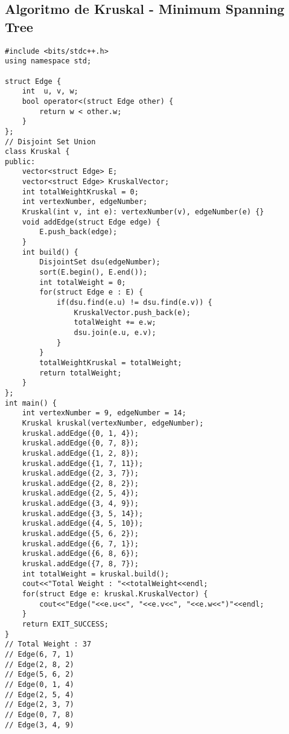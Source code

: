 \documentclass[10pt,letterpaper,twocolumn,twosided]{article}
\begin{document}
\subsection{Algoritmo de Kruskal - Minimum Spanning Tree}
\begin{lstlisting}
#include <bits/stdc++.h>
using namespace std;

struct Edge {
    int  u, v, w;
    bool operator<(struct Edge other) {
        return w < other.w;
    }
};
// Disjoint Set Union
class Kruskal {
public: 
    vector<struct Edge> E;
    vector<struct Edge> KruskalVector;
    int totalWeightKruskal = 0;
    int vertexNumber, edgeNumber;
    Kruskal(int v, int e): vertexNumber(v), edgeNumber(e) {}
    void addEdge(struct Edge edge) {
        E.push_back(edge);
    }
    int build() {
        DisjointSet dsu(edgeNumber);
        sort(E.begin(), E.end());
        int totalWeight = 0;
        for(struct Edge e : E) {
            if(dsu.find(e.u) != dsu.find(e.v)) {
                KruskalVector.push_back(e);
                totalWeight += e.w;
                dsu.join(e.u, e.v);
            }
        }
        totalWeightKruskal = totalWeight;
        return totalWeight;
    }
};
int main() {
    int vertexNumber = 9, edgeNumber = 14;
    Kruskal kruskal(vertexNumber, edgeNumber);
    kruskal.addEdge({0, 1, 4}); 
    kruskal.addEdge({0, 7, 8}); 
    kruskal.addEdge({1, 2, 8}); 
    kruskal.addEdge({1, 7, 11}); 
    kruskal.addEdge({2, 3, 7}); 
    kruskal.addEdge({2, 8, 2}); 
    kruskal.addEdge({2, 5, 4}); 
    kruskal.addEdge({3, 4, 9}); 
    kruskal.addEdge({3, 5, 14}); 
    kruskal.addEdge({4, 5, 10}); 
    kruskal.addEdge({5, 6, 2}); 
    kruskal.addEdge({6, 7, 1}); 
    kruskal.addEdge({6, 8, 6}); 
    kruskal.addEdge({7, 8, 7});
    int totalWeight = kruskal.build();
    cout<<"Total Weight : "<<totalWeight<<endl;
    for(struct Edge e: kruskal.KruskalVector) {
        cout<<"Edge("<<e.u<<", "<<e.v<<", "<<e.w<<")"<<endl;
    }
    return EXIT_SUCCESS;
}
// Total Weight : 37
// Edge(6, 7, 1)
// Edge(2, 8, 2)
// Edge(5, 6, 2)
// Edge(0, 1, 4)
// Edge(2, 5, 4)
// Edge(2, 3, 7)
// Edge(0, 7, 8)
// Edge(3, 4, 9)
\end{lstlisting}
\end{document}
